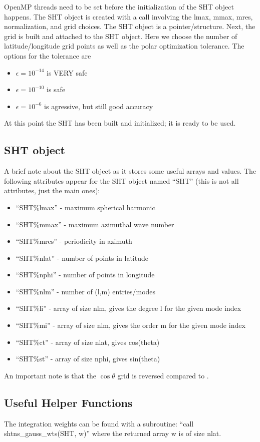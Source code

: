 \documentclass[10pt,letterpaper]{article}
\begin{document}
OpenMP threads need to be set before the initialization of the SHT object happens.
The SHT object is created with a call involving the lmax, mmax, mres, normalization,
and grid choices. The SHT object is a pointer/structure.
Next, the grid is built and attached to the SHT object. Here we choose the number
of latitude/longitude grid points as well as the polar optimization tolerance.
The options for the tolerance are
\begin{itemize}
 \item $\epsilon = 10^{-14}$ is VERY safe
 \item $\epsilon = 10^{-10}$ is safe
 \item $\epsilon = 10^{-6}$ is agressive, but still good accuracy
\end{itemize}
At this point the SHT has been built and initialized; it is ready to be used.

\subsection{SHT object}
A brief note about the SHT object as it stores some useful arrays and values. The
following attributes appear for the SHT object named ``SHT'' (this is not all
attributes, just the main ones):
\begin{itemize}
 \item ``SHT\%lmax'' - maximum spherical harmonic
 \item ``SHT\%mmax'' - maximum azimuthal wave number
 \item ``SHT\%mres'' - periodicity in azimuth
 \item ``SHT\%nlat'' - number of points in latitude
 \item ``SHT\%nphi'' - number of points in longitude
 \item ``SHT\%nlm'' - number of (l,m) entries/modes
 \item ``SHT\%li'' - array of size nlm, gives the degree l for the given mode index
 \item ``SHT\%mi'' - array of size nlm, gives the order m for the given mode index
 \item ``SHT\%ct'' - array of size nlat, gives cos(theta)
 \item ``SHT\%st'' - array of size nphi, gives sin(theta)
\end{itemize}
An important note is that the $\cos\theta$ grid is reversed compared to \rayleigh.

\subsection{Useful Helper Functions}
The integration weights can be found with a subroutine: ``call shtns\_gauss\_wts(SHT, w)''
where the returned array w is of size nlat.
\end{document}
